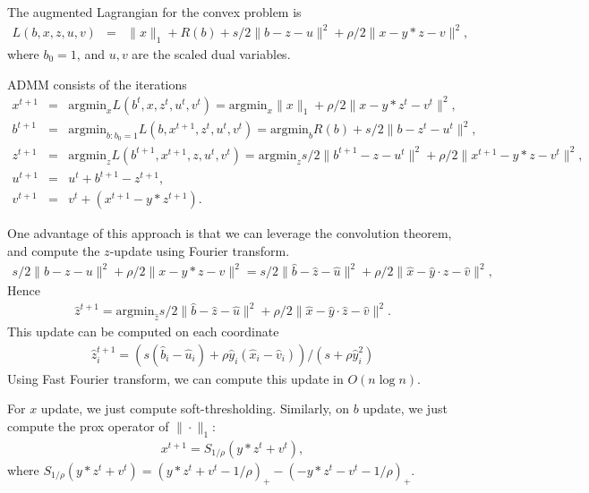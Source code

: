 \documentclass[letter, 10pt]{article}
\numberwithin{equation}{section}
\begin{document}
 The augmented Lagrangian for the convex problem is 
\begin{eqnarray*}
 L(b, x , z, u, v)&=&\|x\|_1 + R(b) +s/2 \| b-z-u\|^2 +
 \rho /2 \| x-y*z-v\|^2,
\end{eqnarray*}
where $ b_0 =1$, and $u, v$ are the scaled dual variables.  

ADMM consists of the iterations
\begin{eqnarray*}
x^{t+1}&=&\mathrm{argmin}_{x} L(b^{t}, x , z^{t}, u^{t}, v^{t})
= \mathrm{argmin}_{x} \|x\|_1+ \rho /2 \| x-y*z^{t}-v^{t}\|^2,\\
b^{t+1}&=&\mathrm{argmin}_{b: b_0=1} L(b, x^{t+1} , z^{t}, u^{t}, v^{t})
=\mathrm{argmin}_{b} R(b) +s/2 \| b-z^{t}-u^{t}\|^2,\\
z^{t+1}&=&\mathrm{argmin}_{z} L(b^{t+1}, x^{t+1}, z , u^{t}, v^{t})
= \mathrm{argmin}_{z} s/2 \| b^{t+1}-z-u^{t}\|^2 +
 \rho /2 \| x^{t+1}-y*z-v^{t}\|^2, \\
u^{t+1}&=& u^t + b^{t+1}-z^{t+1},\\
v^{t+1}&=& v^{t}+ (x^{t+1}-y*z^{t+1}).
 \end{eqnarray*}

One advantage of this approach is that we can leverage the convolution theorem, and compute the $z$-update using Fourier transform.  
 \begin{eqnarray*}
 s/2 \| b-z-u\|^2 +
 \rho /2 \| x-y*z-v\|^2 
 = s/2 \| \hat b-\hat z- \hat u\|^2 +
 \rho /2 \| \hat x-\hat y\cdot \hat z-\hat v\|^2,
  \end{eqnarray*}
 Hence  
  \begin{eqnarray*}
 \hat z^{t+1} 
 =\mathrm{argmin}_{\hat z} s/2 \| \hat b-\hat z- \hat u\|^2 +
 \rho /2 \| \hat x-\hat y\cdot \hat z-\hat v\|^2 .
  \end{eqnarray*} 
  This update can be computed on each coordinate
    \begin{eqnarray*}
 \hat z^{t+1}_i
 = (s(\hat b_i- \hat u_i)+\rho \hat y_i (\hat x_i-\hat v_i))/(s +\rho \hat y_i^2)
  \end{eqnarray*} 
 Using Fast Fourier transform, we can compute this update in $O(n\log n)$. 
  
For $x$ update, we just compute soft-thresholding. Similarly, on $b$ update, we just compute the prox operator of $\|\cdot\|_1$:
   \begin{eqnarray*}
 x^{t+1}
 = S_{1/\rho}(y*z^{t}+v^{t}),
  \end{eqnarray*}
  where $S_{1/\rho} (y*z^{t}+v^{t}) = 
  (y*z^{t}+v^{t}-1/\rho)_{+} - (-y*z^{t}-v^{t}-1/\rho)_{+}$.
  
\end{document}
